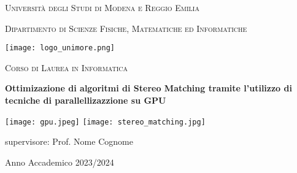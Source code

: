 \documentclass{article}
\begin{document}

\begin{titlepage}

    \centering

    \vspace{3cm}

    {\scshape\huge Università degli Studi di Modena e Reggio Emilia\par}
    \vspace{2cm}
    {\scshape\Large Dipartimento di Scienze Fisiche, Matematiche ed Informatiche\par}

    \vspace{1cm}

    \texttt{[image: logo\_unimore.png]}

    {\scshape\Large Corso di Laurea in Informatica \par}

    \vspace{3cm}

    \textbf{\huge Ottimizazione di algoritmi di Stereo Matching tramite l'utilizzo di tecniche di parallellizazzione su GPU}

    \vspace{1cm}
    
    \begin{minipage}{.9\textwidth}
      \centering
      \texttt{[image: gpu.jpeg]}
      \texttt{[image: stereo\_matching.jpg]}
    \end{minipage}%


    
    \vfill
    supervisore: Prof. Nome Cognome\par
    \vspace{0.5cm}
    Anno Accademico 2023/2024

\end{titlepage}
\end{document}
